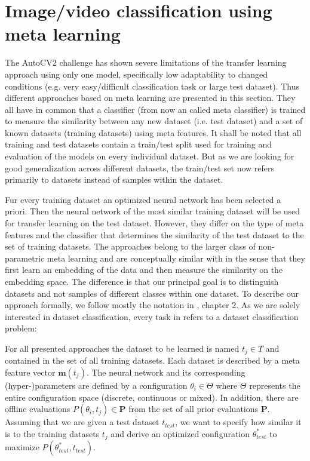 \documentclass{article}
\begin{document}
\section{Image/video classification using meta learning}
\label{sec:ml}

The AutoCV2 challenge has shown severe limitations of the transfer learning approach using only one model, specifically low adaptability to changed conditions (e.g. very easy/difficult classification task or large test dataset). Thus different approaches based on meta learning are presented in this section. They all have in common that a classifier (from now an called meta classifier) is trained to measure the similarity between any new dataset (i.e. test dataset) and a set of known datasets (training datasets) using meta features. It shall be noted that all training and test datasets contain a train/test split used for training and evaluation of the models on every individual dataset. But as we are looking for good generalization across different datasets, the train/test set now refers primarily to datasets instead of samples within the dataset.

Fur every training dataset an optimized neural network has been selected a priori. Then the neural network of the most similar training dataset will be used for transfer learning on the test dataset. However, they differ on the type of meta features and the classifier that determines the similarity of the test dataset to the set of training datasets. The approaches belong to the larger class of non-parametric meta learning and are conceptually similar with \cite{vinyals16, snell17, sung18} in the sense that they first learn an embedding of the data and then measure the similarity on the embedding space. The difference is that our principal goal is to distinguish datasets and not samples of different classes within one dataset. To describe our approach formally, we follow mostly the notation in \cite{hutter19}, chapter 2. As we are solely interested in dataset classification, every task in \cite{hutter19} refers to a dataset classification problem:

For all presented approaches the dataset to be learned is named $t_j \in T$ and contained in the set of all training datasets. Each dataset is described by a meta feature vector $\mathbf{m}(t_j)$. The neural network and its corresponding (hyper-)parameters are defined by a configuration $\theta_i \in \Theta$ where $\Theta$ represents the entire configuration space (discrete, continuous or mixed). In addition, there are offline evaluations $P(\theta_i, t_j) \in \mathbf{P}$ from the set of all prior evaluations $\mathbf{P}$. Assuming that we are given a test dataset $t_{test}$, we want to specify how similar it is to the training datasets $t_j$ and derive an optimized configuration $\theta^*_{test}$ to maximize $P(\theta^*_{test}, t_{test})$.
\end{document}
